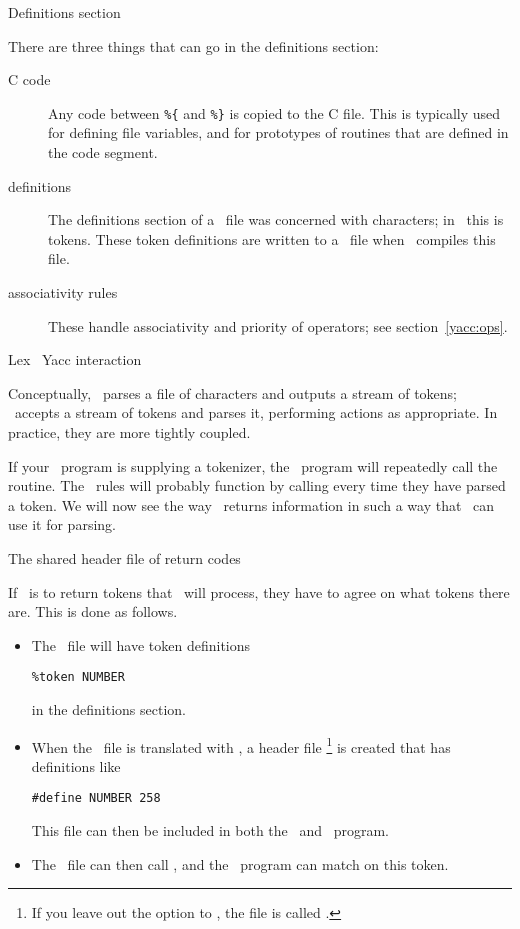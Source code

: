  {Definitions section}
\label{yacc:def}

There are three things that can go in the definitions section:
\begin{description}
\item[C code] Any code between \verb+%{+ and \verb+%}+
  is copied to the C file. This is typically used for defining file
  variables, and for prototypes of routines that are defined in the
  code segment.
\item[definitions] The definitions section of a \lex\ file was
  concerned with characters; in \yacc\ this is tokens. These token
  definitions are written to a~ file when \yacc\ compiles this file.
\item[associativity rules] These handle associativity and priority of
  operators; see section~\ref{yacc:ops}.
\end{description}

 {Lex \ Yacc interaction}

Conceptually, \lex\ parses a file of characters and outputs a stream
of tokens; \yacc\ accepts a stream of tokens and parses it, performing
actions as appropriate. In practice, they are more tightly coupled.

If your \lex\ program is supplying a tokenizer, the \yacc\ program
will repeatedly call the  routine. The \lex\ rules will
probably function by calling  every time they have
parsed a token. We will now see the way \lex\ returns information in
such a way that \yacc\ can use it for parsing.

 {The shared header file of return codes}
\label{sec:returncode}

If \lex\ is to return tokens that \yacc\ will process, they have to
agree on what tokens there are. This is done as follows.
\begin{itemize}
\item The \yacc\ file will have token definitions
\begin{verbatim}
%token NUMBER
\end{verbatim}
in the definitions section.
\item When the \yacc\ file is translated with , a header
  file \footnote{If you leave out the  option to
    \yacc, the file is called .} is created that has
  definitions like
\begin{verbatim}
#define NUMBER 258
\end{verbatim}
This file can then be included in both the \lex\ and \yacc\ program.
\item The \lex\ file can then call , and the
  \yacc\ program can match on this token.
\end{itemize}

